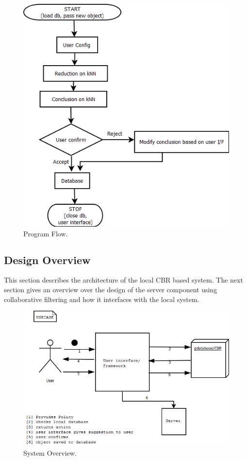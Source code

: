 \begin{figure}[htbp]
\begin{center}
\includegraphics[width = \textwidth]{DesignReport/uml/flowchart.png}
\caption{Program Flow.}
\label{DesignFlowChrt}
\end{center}
\end{figure}

\subsection{Design Overview}
This section describes the architecture of the local CBR based system. The next section gives an overview over the design of the server component using collaborative filtering and how it interfaces with the local system.  

\begin{figure}[htbp]
\begin{center}
\includegraphics[width = \textwidth]{DesignReport/uml/Case.png}
\caption{System Overview.}
\label{SystemOverview}
\end{center}
\end{figure}

